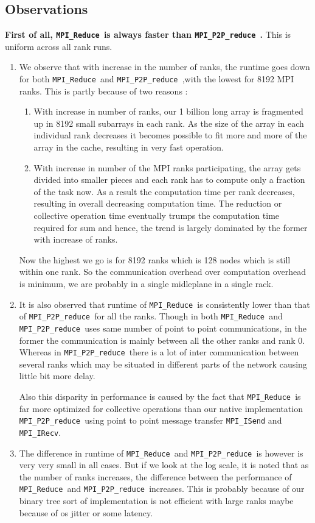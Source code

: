 \documentclass[a4paper,12 pt]{article}
\newcommand{\mpi}{\texttt{MPI\_Reduce }}
\newcommand{\pp}{\texttt{MPI\_P2P\_reduce }}
\begin{document}
\subsection{Observations}
\textbf{First of all, \mpi is always faster than \pp.} This is uniform across all rank runs. 

\begin{enumerate}
\item We observe that with increase in the number of ranks, the runtime goes down for both \mpi and \pp,with the lowest for 8192 MPI ranks. This is partly because of two reasons :
\begin{enumerate}
\item With increase in number of ranks, our 1 billion long array is fragmented up in 8192 small subarrays in each rank. As the size of the array in each individual rank decreases it becomes possible to fit more and more of the array in the cache, resulting in very fast operation.

\item With increase in number of the MPI ranks participating, the array gets divided into smaller pieces and each rank has to compute only a fraction of the task now. As a result the computation time per rank decreases, resulting in overall decreasing computation time. The reduction or collective operation time eventually trumps the computation time required for sum and hence, the trend is largely dominated by the former with increase of ranks.
\end{enumerate}
Now the highest we go is for 8192 ranks which is 128 nodes which is still within one rank. So the communication overhead over computation overhead is minimum, we are probably in a single midleplane in a single rack.

\item It is also observed that runtime of \mpi is consistently lower than that of \pp for all the ranks. Though in both \mpi and \pp uses same number of point to point communications, in the former the communication is mainly between all the other ranks and rank 0. Whereas in \pp there is a lot of inter communication between several ranks which may be situated in different parts of the network causing little bit more delay. 

Also this disparity in performance is caused by the fact that \mpi is far more optimized for collective operations than our native implementation \pp using point to point message transfer \texttt{MPI\_ISend} and \texttt{MPI\_IRecv}. 

\item The difference in runtime of \mpi and \pp is however is very very small in all cases. But if we look at the log scale, it is noted that as the number of ranks increases, the difference between the performance of \mpi and \pp increases. This is probably because of our binary tree sort of implementation is not efficient with large ranks maybe because of os jitter or some latency. 

\end{enumerate}
\end{document}
